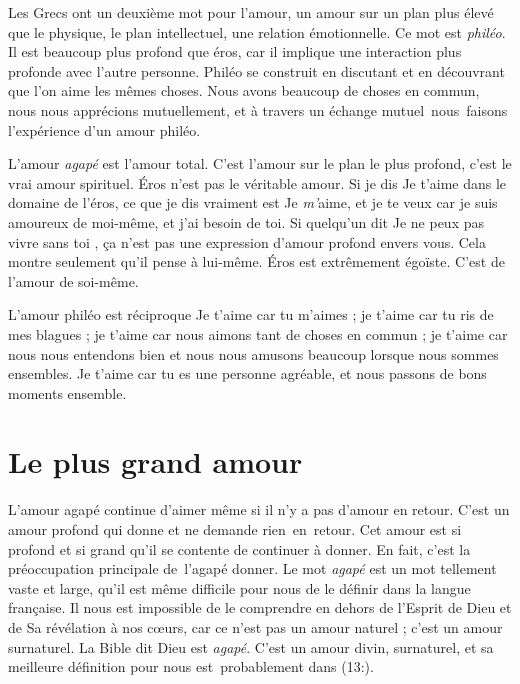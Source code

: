 Les Grecs ont un deuxième mot pour l'amour,
 un amour sur un plan plus élevé que le physique, le plan intellectuel,
 une relation émotionnelle. Ce mot est \emph{philéo}.
 Il est beaucoup plus profond que éros, car il implique une interaction
 plus profonde avec l'autre personne.
 Philéo se construit en discutant et en découvrant que l'on aime
 les mêmes choses. Nous avons beaucoup de choses en commun,
 nous nous apprécions mutuellement, et à travers un échange mutuel~nous~faisons
 l'expérience  d'un amour philéo.

L'amour \emph{agapé} est l'amour total.
 C'est l'amour sur le plan le plus profond, c'est le vrai amour spirituel.
 Éros n'est pas le véritable amour. Si je dis\frcolon{} \Og Je t'aime \Fg{}
 dans le domaine de l'éros, ce que je dis vraiment est\frcolon{}
 \Og Je \emph{m'}aime, et je te veux car je suis amoureux de moi-même,
 et j'ai besoin de toi. \Fg{}
 Si quelqu'un dit\frcolon{} \Og Je ne peux pas vivre sans toi \Fg{},
 ça n'est pas une expression d'amour profond envers vous.
 Cela montre seulement qu'il pense à lui-même.
 Éros est extrêmement égoïste. C'est de l'amour de soi-même.

L'amour philéo est réciproque\frcolon{} \Og Je t'aime car tu m'aimes ;
 je t'aime car tu ris de mes blagues ;
 je t'aime car nous aimons tant de choses en commun ;
 je t'aime car nous nous entendons bien et nous nous amusons beaucoup
 lorsque nous sommes ensembles. Je t'aime car
 tu es une personne agréable, et nous passons de bons moments ensemble. \Fg{}


\section{Le plus grand amour}

L'amour agapé continue d'aimer même si il n'y a pas d'amour en retour.
 C'est un amour profond qui donne et ne demande rien~en~retour.
 Cet amour est si profond et si grand qu'il se contente
 de continuer à donner.
 En fait, c'est la préoccupation principale de~l'agapé\frcolon{} donner.
 Le mot \emph{agapé} est un mot tellement vaste et large,
 qu'il est même difficile pour nous de le définir dans la langue française.
 Il nous est impossible de le comprendre en dehors de l'Esprit de Dieu
 et de Sa révélation à nos cœurs, car ce n'est pas un amour naturel ;
 c'est un amour surnaturel.
 La Bible dit\frcolon{} \Og Dieu est \emph{agapé}. \Fg{}
 C'est un amour divin, surnaturel, et sa meilleure définition pour nous
 est~probablement dans (13:).


